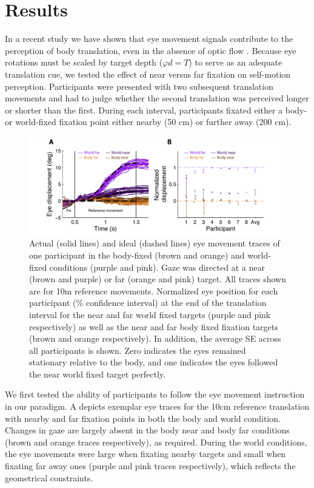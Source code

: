 \section{Results}

In a recent study we have shown that eye movement signals contribute to the perception of body translation, even in the absence of optic flow \cite{clemens2015a}. Because eye rotations must be scaled by target depth ($\varphi d = T$) to serve as an adequate translation cue, we tested the effect of near versus far fixation on self-motion perception. Participants were presented with two subsequent translation movements  and had to judge whether the second translation was perceived longer or shorter than the first. During each interval, participants fixated either a body- or world-fixed fixation point either nearby (50 cm) or further away (200 cm).

\begin{figure}
    \includegraphics[width=1.0\textwidth]{src/paper4/p4_figure2.pdf}

    \caption{ Actual (solid lines) and ideal (dashed lines) eye movement traces of one participant in the body-fixed (brown and orange) and world-fixed conditions (purple and pink). Gaze was directed at a near (brown and purple) or far (orange and pink) target. All traces shown are for 10m reference movements.  Normalized eye position for each participant (\% confidence interval) at the end of the translation interval for the near and far world fixed targets (purple and pink respectively) as well as the near and far body fixed fixation targets (brown and orange respectively). In addition, the average \textpm SE across all participants is shown. Zero indicates the eyes remained stationary relative to the body, and one indicates the eyes followed the near world fixed target perfectly.}
    \label{p4:fig2}
\end{figure}

We first tested the ability of participants to follow the eye movement instruction in our paradigm. A depicts exemplar eye traces for the 10cm reference translation with nearby and far fixation points in both the body and world condition. Changes in gaze are largely absent in the body near and body far conditions (brown and orange traces respectively), as required. During the world conditions, the eye movements were large when fixating nearby targets and small when fixating far away ones (purple and pink traces respectively), which reflects the geometrical constraints. 

